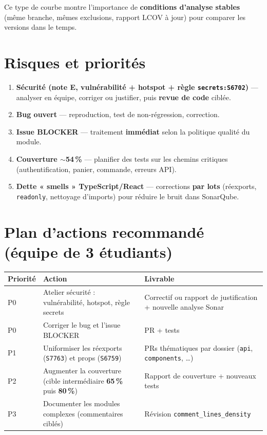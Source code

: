 \documentclass[11pt,a4paper]{article}
\begin{document}
Ce type de courbe montre l'importance de \textbf{conditions d'analyse stables} (même branche, mêmes exclusions, rapport LCOV à jour) pour comparer les versions dans le temps.

\section{Risques et priorités}

\begin{enumerate}[label=\arabic*.]
  \item \textbf{Sécurité (note E, vulnérabilité + hotspot + règle \texttt{secrets:S6702})} --- analyser en équipe, corriger ou justifier, puis \textbf{revue de code} ciblée.
  \item \textbf{Bug ouvert} --- reproduction, test de non-régression, correction.
  \item \textbf{Issue BLOCKER} --- traitement \textbf{immédiat} selon la politique qualité du module.
  \item \textbf{Couverture $\sim$54\,\%} --- planifier des tests sur les chemins critiques (authentification, panier, commande, erreurs API).
  \item \textbf{Dette « smells » TypeScript/React} --- corrections \textbf{par lots} (réexports, \texttt{readonly}, nettoyage d'imports) pour réduire le bruit dans SonarQube.
\end{enumerate}

\section{Plan d'actions recommandé (équipe de 3 étudiants)}

\begin{table}[h]
  \centering
  \begin{tabular}{@{}llp{6.5cm}@{}}
    \toprule
    \textbf{Priorité} & \textbf{Action} & \textbf{Livrable} \\
    \midrule
    P0 & Atelier sécurité : vulnérabilité, hotspot, règle secrets & Correctif ou rapport de justification + nouvelle analyse Sonar \\
    P0 & Corriger le bug et l'issue BLOCKER & PR + tests \\
    P1 & Uniformiser les réexports (\texttt{S7763}) et props (\texttt{S6759}) & PRs thématiques par dossier (\texttt{api}, \texttt{components}, \ldots) \\
    P2 & Augmenter la couverture (cible intermédiaire \textbf{65\,\%} puis \textbf{80\,\%}) & Rapport de couverture + nouveaux tests \\
    P3 & Documenter les modules complexes (commentaires ciblés) & Révision \texttt{comment\_lines\_density} \\
    \bottomrule
  \end{tabular}
\end{table}
\end{document}
